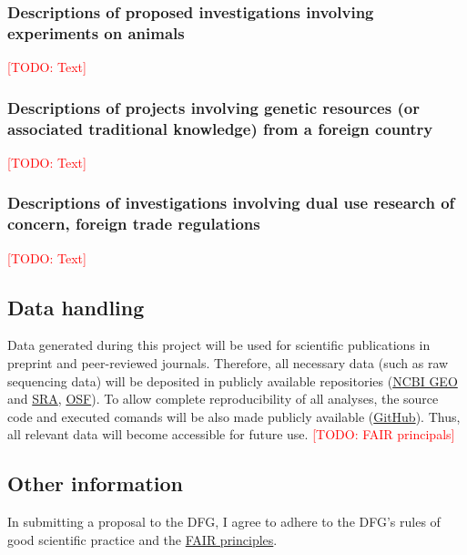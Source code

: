 \documentclass[ngerman,firsttime]{dfgproposal}
\newcommand{\todo}[1]{\xspace{\textcolor{red}{[TODO: #1]}}\xspace}
\begin{document}
	\subsubsection{Descriptions of proposed investigations involving experiments on animals}
	\todo{Text}
	
	\subsubsection{Descriptions of projects involving genetic resources (or associated traditional knowledge) from a foreign country}
	\todo{Text}
	
	\subsubsection{Descriptions of investigations involving dual use research of concern, foreign trade regulations}
	\todo{Text}
	
	
	\subsection{Data handling}
	Data generated during this project will be used for scientific publications in
	preprint and peer-reviewed journals. Therefore, all necessary data (such as raw
	sequencing data) will be deposited in publicly available repositories
	(\href{https://www.ncbi.nlm.nih.gov/geo/}{NCBI GEO} and
	\href{https://www.ncbi.nlm.nih.gov/sra}{SRA}, \href{https://osf.io/}{OSF}). To
	allow complete reproducibility of all analyses, the source code and executed
	comands will be also made publicly available
	(\href{https://github.com/}{GitHub}).  Thus, all relevant data will become
	accessible for future use. 
	\todo{FAIR principals}
	
	\subsection{Other information}
	In submitting a proposal to the DFG, I agree to adhere to the DFG's rules of good scientific practice and the \href{https://www.nature.com/articles/sdata201618}{FAIR principles}.
	
	
	
\end{document}
